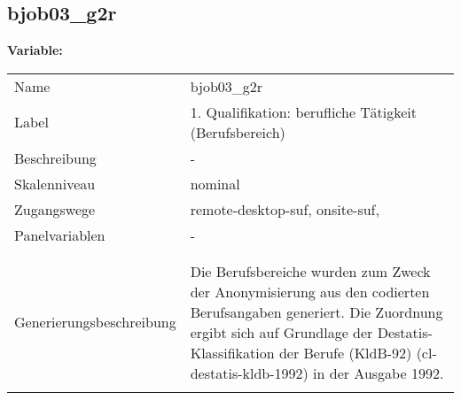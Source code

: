 	
	
	\subsection{bjob03\_g2r}
	\label{subSection:bjob03_g2r}

	\noindent\textbf{Variable:}\\
		\begin{tabular}{lL{11.3cm}}
			\label{tableVariable:bjob03_g2r}
			Name & bjob03\_g2r \\
			Label & 1. Qualifikation: berufliche Tätigkeit (Berufsbereich) \\
			Beschreibung & - \\
			Skalenniveau & nominal \\
			Zugangswege &
				remote-desktop-suf,
				onsite-suf,
 \\
			Panelvariablen & -
			 \\
			 \\
 \\
					Generierungsbeschreibung & Die Berufsbereiche wurden zum Zweck der Anonymisierung aus den codierten Berufsangaben generiert. Die Zuordnung ergibt sich auf Grundlage der Destatis-Klassifikation der Berufe (KldB-92) (cl-destatis-kldb-1992) in der Ausgabe 1992. 
				 \\	
			 \\
		\end{tabular}






